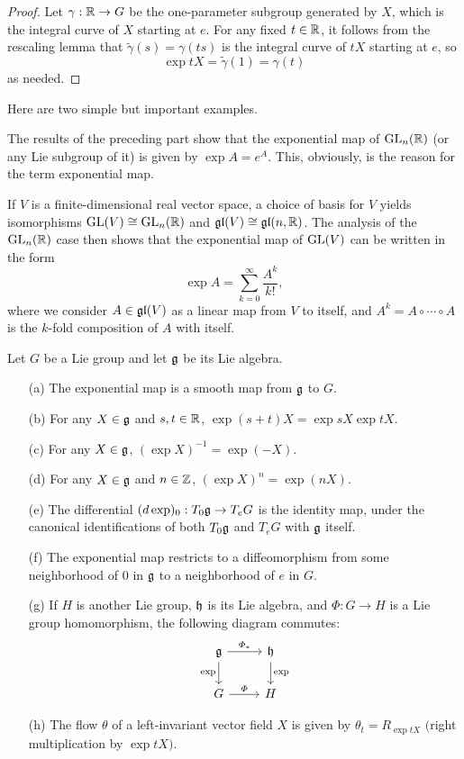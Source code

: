 \begin{proof}
Let $\gamma:\mathbb{R}\to G$ be the one-parameter subgroup generated by $X$, which is the integral curve of $X$ starting at $e$. For any fixed $t\in\mathbb{R}$, it follows from the rescaling lemma 
that $\widetilde{\gamma}(s)=\gamma(ts)$ is the integral curve of $tX$ starting at $e$, so
\[\exp tX=\widetilde{\gamma}(1)=\gamma(t)\]
as needed.
\end{proof}
Here are two simple but important examples.
\begin{example}
The results of the preceding part show that the exponential map of $\mathrm{GL}_n(\mathbb{R})$ (or any Lie subgroup of it) is given by $\exp A=e^A$. This, obviously, is the reason for the term exponential map.
\end{example}
\begin{example}
If $V$ is a finite-dimensional real vector space, a choice of basis for $V$ yields isomorphisms $\mathrm{GL}(V)\cong\mathrm{GL}_n(\mathbb{R})$ and $\mathfrak{gl}(V)\cong\mathfrak{gl}(n,\mathbb{R})$. The analysis of the $\mathrm{GL}_n(\mathbb{R})$ case then shows that the exponential map of $\mathrm{GL}(V)$ can be written in
the form 
\[\exp A=\sum_{k=0}^{\infty}\frac{A^k}{k!},\]
where we consider $A\in\mathfrak{gl}(V)$ as a linear map from $V$ to itself, and $A^k=A\circ\cdots\circ A$ is the $k$-fold composition of $A$ with itself.
\end{example}
\begin{proposition}\label{Lie group exp prop}
Let $G$ be a Lie group and let $\mathfrak{g}$ be its Lie algebra.
\begin{itemize}
\item[(a)] The exponential map is a smooth map from $\mathfrak{g}$ to $G$.
\item[(b)] For any $X\in\mathfrak{g}$ and $s,t\in\mathbb{R}$, $\exp(s+t)X=\exp sX\exp tX$.
\item[(c)] For any $X\in\mathfrak{g}$, $(\exp X)^{-1}=\exp(-X)$.
\item[(d)] For any $X\in\mathfrak{g}$ and $n\in\mathbb{Z}$, $(\exp X)^n=\exp(nX)$.
\item[(e)] The differential $(d\exp)_0:T_0\mathfrak{g}\to T_eG$ is the identity map, under the canonical identifications of both $T_0\mathfrak{g}$ and $T_eG$ with $\mathfrak{g}$ itself.
\item[(f)] The exponential map restricts to a diffeomorphism from some neighborhood of $0$ in $\mathfrak{g}$ to a neighborhood of $e$ in $G$.
\item[(g)] If $H$ is another Lie group, $\mathfrak{h}$ is its Lie algebra, and $\varPhi:G\to H$ is a Lie group homomorphism, the following diagram commutes:
\[\begin{tikzcd}
\g\ar[r,"\varPhi_*"]\ar[d,swap,"\exp"]&\h\ar[d,"\exp"]\\
G\ar[r,"\varPhi"]&H
\end{tikzcd}\]
\item[(h)] The flow $\theta$ of a left-invariant vector field $X$ is given by $\theta_t=R_{\exp tX}$ $($right multiplication by $\exp tX$$)$.
\end{itemize}
\end{proposition}
